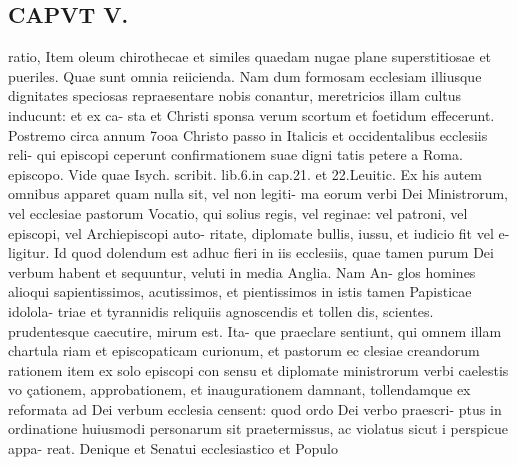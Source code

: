 \documentclass{article}
\begin{document}
\begin{pages}
\section*{CAPVT  V. }
\marginpar{[ p.363 ]}ratio, Item oleum chirothecae et similes quaedam nugae plane superstitiosae et pueriles. Quae sunt omnia reiicienda. Nam dum formosam ecclesiam illiusque dignitates speciosas repraesentare nobis conantur, meretricios illam cultus inducunt: et ex ca- sta et Christi sponsa verum scortum et foetidum effecerunt. Postremo circa annum 7ooa Christo passo in Italicis et occidentalibus ecclesiis reli- qui episcopi ceperunt confirmationem suae digni tatis petere a Roma. episcopo. Vide quae Isych. scribit. lib.6.in cap.21. et 22.Leuitic. Ex his autem omnibus apparet quam nulla sit, vel non legiti- ma eorum verbi Dei Ministrorum, vel ecclesiae pastorum Vocatio, qui solius regis, vel reginae: vel patroni, vel episcopi, vel Archiepiscopi auto- ritate, diplomate bullis, iussu, et iudicio fit vel e- ligitur. Id quod dolendum est adhuc fieri in iis ecclesiis, quae tamen purum Dei verbum habent et sequuntur, veluti in media Anglia. Nam An- glos homines alioqui sapientissimos, acutissimos, et pientissimos in istis tamen Papisticae idolola- triae et tyrannidis reliquiis agnoscendis et tollen dis, scientes. prudentesque caecutire, mirum est. Ita- que praeclare sentiunt, qui omnem illam chartula riam et episcopaticam curionum, et pastorum ec clesiae creandorum rationem item ex solo episcopi con sensu et diplomate ministrorum verbi caelestis vo çationem, approbationem, et inaugurationem damnant, tollendamque ex reformata ad Dei verbum ecclesia censent: quod ordo Dei verbo praescri- ptus in ordinatione huiusmodi personarum sit praetermissus, ac violatus sicut i perspicue appa- reat. Denique et Senatui ecclesiastico et Populo 

\end{pages}
\end{document}

